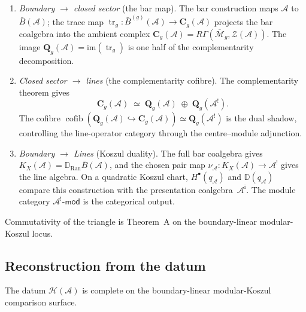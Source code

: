 \documentclass[11pt,reqno]{amsart}
\theoremstyle{definition}
\theoremstyle{remark}
\newcommand{\cA}{\mathcal{A}}
\newcommand{\cH}{\mathcal{H}}
\newcommand{\cM}{\mathcal{M}}
\newcommand{\cZ}{\mathcal{Z}}
\newcommand{\Ran}{\mathrm{Ran}}
\newcommand{\barB}{\bar{B}}
\DeclareMathOperator{\tr}{tr}
\DeclareMathOperator{\cofib}{cofib}
\numberwithin{equation}{section}
\begin{document}
\begin{enumerate}[label=(\roman*)]
\item \emph{Boundary $\to$ closed sector} (the bar map).
The bar construction maps $\cA$ to $\barB(\cA)$; the trace map
$\tr_g \colon \barB^{(g)}(\cA) \to \mathbf{C}_g(\cA)$ projects
the bar coalgebra into the ambient complex
$\mathbf{C}_g(\cA) = R\Gamma(\overline{\cM}_g,
\cZ(\cA))$. The image
$\mathbf{Q}_g(\cA) = \mathrm{im}(\tr_g)$ is one half of the
complementarity decomposition.

\item \emph{Closed sector $\to$ lines} (the complementarity cofibre).
The complementarity theorem gives
\[
\mathbf{C}_g(\cA) \;\simeq\;
\mathbf{Q}_g(\cA) \;\oplus\; \mathbf{Q}_g(\cA^!).
\]
The cofibre $\cofib(\mathbf{Q}_g(\cA) \hookrightarrow
\mathbf{C}_g(\cA)) \simeq \mathbf{Q}_g(\cA^!)$ is the dual
shadow, controlling the line-operator category through the
centre--module adjunction.

\item \emph{Boundary $\to$ Lines} (Koszul duality).
The full bar coalgebra gives
$K_X(\cA)=\mathbb D_{\Ran}\barB(\cA)$, and the chosen pair map
$\nu_\cA\colon K_X(\cA)\to\cA^!$ gives the line algebra.  On a
quadratic Koszul chart, $H^\bullet(q_\cA)$ and
$\mathbb D(q_\cA)$ compare this construction with the presentation
coalgebra~$\cA^{\mathrm i}$.  The
module category $\cA^!\text{-}\mathsf{mod}$ is the categorical
output.
\end{enumerate}

Commutativity of the triangle is Theorem~A on the
boundary-linear modular-Koszul locus.


\subsection{Reconstruction from the datum}\label{subsec:reconstruction}

The datum $\cH(\cA)$ is complete on the boundary-linear
modular-Koszul comparison surface.
\end{document}
